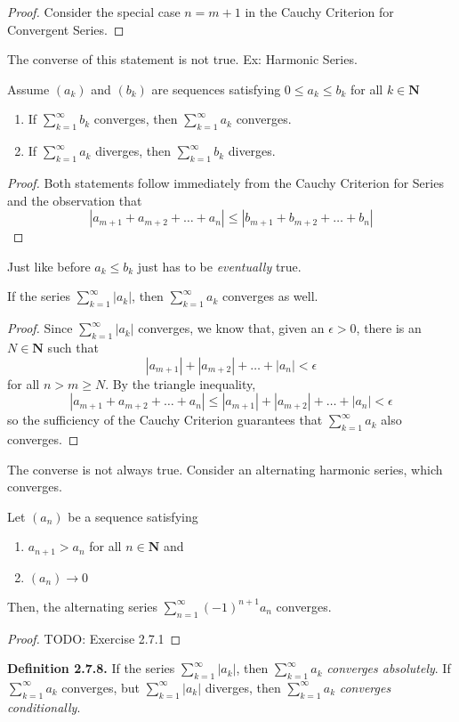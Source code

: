     \begin{proof}
        Consider the special case $n = m + 1$ in the Cauchy Criterion for Convergent Series.
    \end{proof}
    The converse of this statement is not true. Ex: Harmonic Series.
    \begin{theorem}
        Assume $(a_k)$ and $(b_k)$ are sequences satisfying $0 \leq a_k \leq b_k$ for all $k \in \textbf{N}$
        \begin{enumerate}
            \item If $\sum_{k=1}^\infty b_k$ converges, then $\sum_{k=1}^\infty a_k$ converges.
            \item If $\sum_{k=1}^\infty a_k$ diverges, then $\sum_{k=1}^\infty b_k$ diverges.
        \end{enumerate}
    \end{theorem}
    \begin{proof}
        Both statements follow immediately from the Cauchy Criterion for Series and the observation that
        $$|a_{m+1} + a_{m+2} + \dots + a_n| \leq |b_{m+1} + b_{m+2} + \dots + b_n|$$
    \end{proof}
    Just like before $a_k \leq b_k$ just has to be \textit{eventually} true.
    \begin{theorem}
        If the series $\sum_{k=1}^\infty |a_k|$, then $\sum_{k=1}^\infty a_k$ converges as well.
    \end{theorem}
    \begin{proof}
        Since $\sum_{k=1}^\infty |a_k|$ converges, we know that, given an $\epsilon > 0$, there is an $N \in \textbf{N}$ such that
        $$|a_{m+1}| + |a_{m+2}| + \dots + |a_n| < \epsilon$$
        for all $n > m \geq N$. By the triangle inequality,
        $$|a_{m+1} + a_{m+2} + \dots + a_n| \leq |a_{m+1}| + |a_{m+2}| + \dots + |a_n| < \epsilon$$ 
        so the sufficiency of the Cauchy Criterion guarantees that $\sum_{k=1}^\infty a_k$ also converges.
    \end{proof}
    The converse is not always true. Consider an alternating harmonic series, which converges.
    \begin{theorem}
        Let $(a_n)$ be a sequence satisfying
        \begin{enumerate}
            \item $a_{n+1} > a_n$ for all $n \in \textbf{N}$ and
            \item $(a_n) \rightarrow 0$
        \end{enumerate}
        Then, the alternating series $\sum_{n=1}^\infty (-1)^{n+1}a_n$ converges.
    \end{theorem}
    \begin{proof}
        TODO: Exercise 2.7.1
    \end{proof}
    \textbf{Definition 2.7.8.} 
    If the series $\sum_{k=1}^\infty |a_k|$, then $\sum_{k=1}^\infty a_k$ \textit{converges absolutely}. If $\sum_{k=1}^\infty a_k$ converges, but $\sum_{k=1}^\infty |a_k|$ diverges, then $\sum_{k=1}^\infty a_k$ \textit{converges conditionally}.
    \newline
